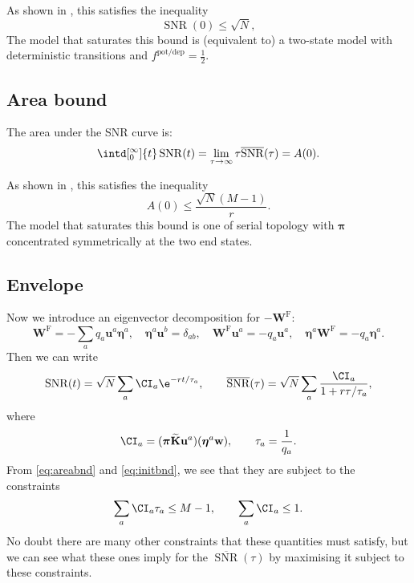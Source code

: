 \documentclass[12pt]{article}
\newcommand{\eq}{\pib}
\newcommand{\pib}{\boldsymbol{\pi}}
\newcommand{\w}{\mathbf{w}}
\newcommand{\W}{\mathbf{W}}
\newcommand{\enc}{\mathbf{K}}
\newcommand{\frg}{\W^{\mathrm{F}}}
\newcommand{\potdep}{^{\text{pot/dep}}}
\newcommand{\ench}{\widetilde{\enc}}
\newcommand{\evr}{\mathbf{u}}
\newcommand{\evl}{\boldsymbol{\eta}}
\DeclareMathOperator{\snr}{SNR}
\newcommand{\snrb}{\overline{\snr}}
\begin{document}
As shown in \cite{Lahiri2013synapse}, this satisfies the inequality
%
\begin{equation}\label{eq:initbnd}
  \snr(0) \leq \sqrt{N},
\end{equation}
%
The model that saturates this bound is (equivalent to) a two-state model with deterministic transitions and $f\potdep=\frac{1}{2}$.

\subsection{Area bound}\label{sec:area}

The area under the SNR curve is:
%
\begin{equation}\label{eq:areadef}
  \intd[_0^\infty]{t} \snr(t) = \lim_{\tau\to\infty} \tau \snrb(\tau) = A(0).
\end{equation}
%

As shown in \cite{Lahiri2013synapse}, this satisfies the inequality
%
\begin{equation}\label{eq:areabnd}
  A(0) \leq \frac{\sqrt{N}(M-1)}{r}.
\end{equation}
%
The model that saturates this bound is one of serial topology with $\eq$ concentrated symmetrically at the two end states.



\subsection{Envelope}\label{sec:envelope}

Now we introduce an eigenvector decomposition for $-\frg$:
%
\begin{equation}\label{eq:eigendecomp}
  \frg = - \sum_a q_a \evr^a \evl^a,
  \quad
  \evl^a \evr^b = \delta_{ab},
  \quad
  \frg \evr^a = -q_a \evr^a,
  \quad
  \evl^a \frg = -q_a \evl^a.
\end{equation}
%
Then we can write
%
\begin{equation}\label{eqsnreig}
  \snr(t) = \sqrt{N}\sum_a \CI_a \e^{-rt/\tau_a},
  \qquad
  \snrb(\tau) = \sqrt{N}\sum_a \frac{\CI_a}{1+r\tau/\tau_a},
\end{equation}
%
where
%
\begin{equation}\label{eq:snrcoeffs}
  \CI_a = (\eq \ench \evr^a) (\evl^a \w),
  \qquad
  \tau_a = \frac{1}{q_a}.
\end{equation}
%
From \eqref{eq:areabnd} and \eqref{eq:initbnd}, we see that they are subject to the constraints
%
\begin{equation}\label{eq:coeffconstr}
  \sum_a \CI_a \tau_a \leq M-1,
  \qquad
  \sum_a \CI_a \leq 1.
\end{equation}
%
No doubt there are many other constraints that these quantities must satisfy, but we can see what these ones imply for the $\snrb(\tau)$ by maximising it subject to these constraints.
\end{document}

